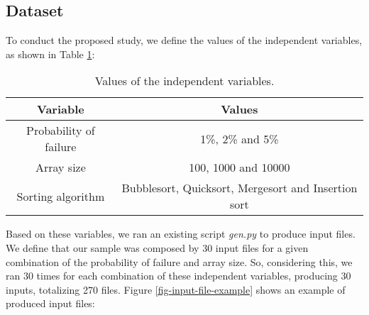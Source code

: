 

\subsection{Dataset}

To conduct the proposed study, we define the values of the independent variables, as shown in Table \ref{table-independent-variables-values}:

\begin{table}[H]
    \caption{Values of the independent variables.}
    \begin{center}
    \begin{tabular}{|c|c|}
    \hline
    \textbf{Variable} & \textbf{Values} \\
    \hline
    Probability of failure & 1\%, 2\% and 5\% \\
    \hline
    Array size & 100, 1000 and 10000 \\
    \hline
    Sorting algorithm & Bubblesort, Quicksort, Mergesort and Insertion sort \\
    \hline
    \end{tabular}
    \label{table-independent-variables-values}
    \end{center}
\end{table}

Based on these variables, we ran an existing script \textit{gen.py} to produce input files. We define that our sample was composed by 30 input files for a given combination of the probability of failure and array size. So, considering this, we ran 30 times for each combination of these independent variables, producing 30 inputs, totalizing 270 files. Figure \ref{fig-input-file-example} shows an example of produced input files:



